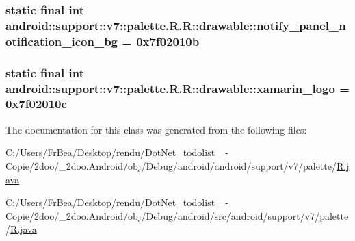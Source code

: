 \hypertarget{classandroid_1_1support_1_1v7_1_1palette_1_1_r_1_1drawable_6e10c72ce4ab74f21caaddc48f3ac9f6}{
\subsubsection[{notify\_\-panel\_\-notification\_\-icon\_\-bg}]{\setlength{\rightskip}{0pt plus 5cm}static final int android::support::v7::palette.R.R::drawable::notify\_\-panel\_\-notification\_\-icon\_\-bg = 0x7f02010b}}
\label{classandroid_1_1support_1_1v7_1_1palette_1_1_r_1_1drawable_6e10c72ce4ab74f21caaddc48f3ac9f6}


\hypertarget{classandroid_1_1support_1_1v7_1_1palette_1_1_r_1_1drawable_e72be1796cf35bb2bef521b138f86301}{
\subsubsection[{xamarin\_\-logo}]{\setlength{\rightskip}{0pt plus 5cm}static final int android::support::v7::palette.R.R::drawable::xamarin\_\-logo = 0x7f02010c}}
\label{classandroid_1_1support_1_1v7_1_1palette_1_1_r_1_1drawable_e72be1796cf35bb2bef521b138f86301}




The documentation for this class was generated from the following files:\begin{CompactItemize}
\item 
C:/Users/FrBea/Desktop/rendu/DotNet\_\-todolist\_ - Copie/2doo/\_\-2doo.Android/obj/Debug/android/android/support/v7/palette/\hyperlink{android_2support_2v7_2palette_2_r_8java}{R.java}\item 
C:/Users/FrBea/Desktop/rendu/DotNet\_\-todolist\_ - Copie/2doo/\_\-2doo.Android/obj/Debug/android/src/android/support/v7/palette/\hyperlink{src_2android_2support_2v7_2palette_2_r_8java}{R.java}\end{CompactItemize}
